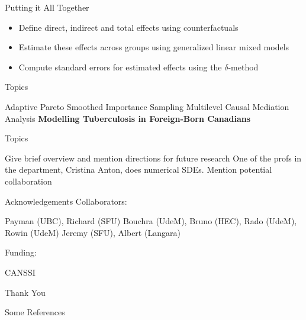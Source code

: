 \documentclass[14pt]{beamer}
\begin{document}
\begin{frame}{Putting it All Together}
    \begin{itemize}
        \item Define direct, indirect and total effects using counterfactuals \newline

        \item Estimate these effects across groups using generalized linear mixed models \newline

        \item Compute standard errors for estimated effects using the $\delta$-method

    \end{itemize}

\end{frame}

\begin{frame}{Topics}
    \begin{outline}
        \1 Adaptive Pareto Smoothed Importance Sampling \newline
        \1 Multilevel Causal Mediation Analysis \newline
        \1 \textbf{Modelling Tuberculosis in Foreign-Born Canadians}
    \end{outline}
\end{frame}

\begin{frame}{Topics}
    \begin{outline}
        \1 Give brief overview and mention directions for future research
        \1 One of the profs in the department, Cristina Anton, does numerical SDEs. Mention potential collaboration
    \end{outline}
\end{frame}

\begin{frame}{Acknowledgements}
    Collaborators:
    \begin{outline}
        \1 Payman (UBC), Richard (SFU)
        \1 Bouchra (UdeM), Bruno (HEC), Rado (UdeM), Rowin (UdeM)
        \1 Jeremy (SFU), Albert (Langara) \newline
    \end{outline}

    Funding:
    \begin{outline}
        \1 CANSSI
    \end{outline}
\end{frame}



\begin{frame}
    \centering
    \Huge Thank You
\end{frame}

\begin{frame}{Some References}
    
    
\end{frame}
\end{document}
